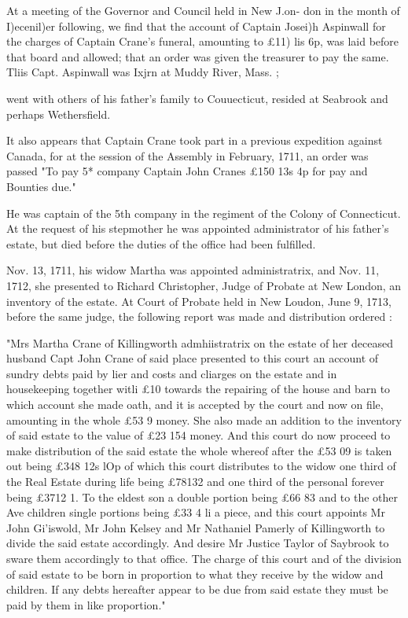 \documentclass[oneside]{book}
\begin{document}
At a meeting of the Governor and Council held in New J.on- 
don in the month of I)ecenil)er following, we find that the account 
of Captain Josei)h Aspinwall for the charges of Captain Crane's 
funeral, amounting to £11)  lis  6p, was laid before that board 
and allowed; that an order was given the treasurer to pay the 
same. Tliis Capt. Aspinwall was Ixjrn at Muddy River, Mass. ; 




went with others of his father's family to Couuecticut, resided at 
Seabrook and perhaps Wethersfield. 

It also appears that Captain Crane took part in a previous 
expedition against Canada, for at the session of the Assembly in 
February, 1711, an order was passed "To pay 5* company 
Captain John Cranes £150  13s  4p for pay and Bounties due." 

He was captain of the 5th company in the regiment of the 
Colony of Connecticut. At the request of his stepmother he was 
appointed administrator of his father's estate, but died before the 
duties of the office had been fulfilled. 

Nov. 13, 1711, his widow Martha was appointed administratrix, 
and Nov. 11, 1712, she presented to Richard Christopher, Judge 
of Probate at New London, an inventory of the estate. At Court 
of Probate held in New Loudon, June 9, 1713, before the same 
judge, the following report was made and distribution ordered : 

"Mrs Martha Crane of Killingworth admhiistratrix on the estate of 
her deceased husband Capt John Crane of said place presented to this 
court an account of sundry debts paid by lier and costs and cliarges on 
the estate and in housekeeping together witli £10 towards the repairing 
of the house and barn to which account she made oath, and it is accepted 
by the court and now on file, amounting in the whole £53   9 money. 
She also made an addition to the inventory of said estate to the value of 
£23  154 money. And this court do now proceed to make distribution 
of the said estate the whole whereof after the £53  09 is taken out 
being £348  12s  lOp of which this court distributes to the widow one 
third of the Real Estate during life being £78132 and one third of the 
personal forever being £3712  1. To the eldest son a double portion 
being £66  83 and to the other Ave children single portions being 
£33 4 li a piece, and this court appoints Mr John Gi'iswold, Mr John 
Kelsey and Mr Nathaniel Pamerly of Killingworth to divide the said 
estate accordingly. And desire Mr Justice Taylor of Saybrook to sware 
them accordingly to that office. The charge of this court and of the 
division of said estate to be born in proportion to what they receive by 
the widow and children. If any debts hereafter appear to be due from 
said estate they must be paid by them in like proportion." 
\end{document}
